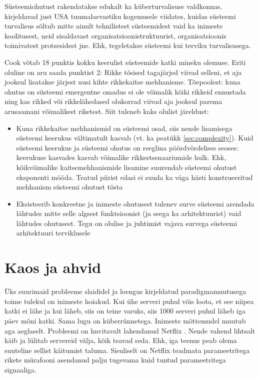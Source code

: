 \documentclass{tufte-book}
\begin{document}
Süsteemiohutust rakendatakse edukalt ka küberturvalisuse valdkonnas. \citeauthor{hbrcyber} kirjeldavad just USA tuumalaevastiku kogemusele viidates, kuidas süsteemi turvalisus sõltub mitte ainult tehnilistest süsteemidest vaid ka inimeste koolitusest, neid sisaldavast organisatsioonistruktuurist, organisatsioonis toimivatest protsesidest jne. Ehk, tegeletakse süsteemi kui terviku turvalisusega.\cite{hbrcyber} 

Cook \citep{cook1998complex} võtab 18 punktis kokku keerulist süsteemide katki mineku olemuse. Eriti oluline on aru saada punktist 2: Rikke tõsised tagajärjed viivad selleni, et aja jooksul lisatakse järjest uusi kihte rikkekaitse mehhanisme. Tõepoolest: kuna ohutus on süsteemi emergentne omadus ei ole võimalik kõiki rikkeid ennustada ning kas rikked või rikkelähedased olukorrad viivad aja jooksul parema arusaamani võimalikest riketest. Siit tuleneb kaks olulist järeldust:
\begin{itemize}
	\item Kuna rikkekaitse mehhanismid on süsteemi osad, siis nende lisamisega süsteemi keerukus vältimatult kasvab (vt. ka peatükk \ref{sec:complexity}). Kuid süsteemi keerukus ja süsteemi ohutus on reeglina pöördvõrdelises seoses: keerukuse kasvades kasvab võimalike rikkestsenaariumide hulk. Ehk, kõikvõimalike kaitsemehhanismide lisamine suurendab süsteemi ohutust eksponenti mööda. Teatud piirist edasi ei suuda ka väga hästi konstrueeritud mehhanism süsteemi ohutust tõsta
	\item Eksisteerib konkreetne ja inimeste ohutusest tulenev surve süsteemi arendada lähtudes mitte selle algsest funktsioonist (ja seega ka arhitektuurist) vaid lähtudes ohutusest. Tegu on olulise ja juhtimist vajava survega süsteemi arhitektuuri terviklusele
\end{itemize} 

\section{Kaos ja ahvid}
Üks suurimaid probleeme slaididel ja loengus kirjeldatud paradigmamuutusega toime tulekul on inimeste hoiakud. Kui ühe serveri puhul võis loota, et see niipea katki ei lähe ja kui läheb, siis on teine varuks, siis 1000 serveri puhul läheb iga päev mõni katki. Sama lugu on küberrünnetega. Inimeste mõttemudel muutub aga aeglaselt. Probleemi on huvitavalt lahendanud Netflix \cite{monkey}. Nende vahend lihtsalt käib ja lülitab servereid välja, kõik teavad seda. Ehk, iga teenus peab olema suuteline sellist käitumist taluma. Sisuliselt on Netflix teadmata parameetritega rikete mürafooni asendanud palju tugevama kuid tuntud parameetritega signaaliga.   
\end{document}
